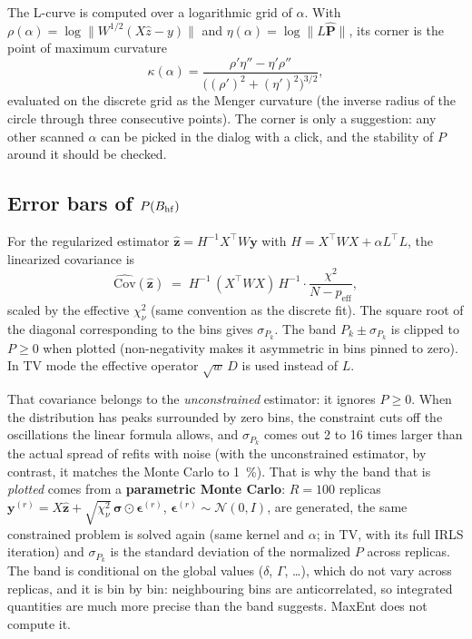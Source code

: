 \medskip
The L-curve is computed over a logarithmic grid of $\alpha$. With
$\rho(\alpha)=\log\lVert W^{1/2}(X\hat z-y)\rVert$ and
$\eta(\alpha)=\log\lVert L\hat{\bm P}\rVert$, its corner is the point of maximum
curvature
\begin{equation}
  \kappa(\alpha)=\frac{\rho'\eta''-\eta'\rho''}{\bigl((\rho')^2+(\eta')^2\bigr)^{3/2}},
\end{equation}
evaluated on the discrete grid as the Menger curvature (the inverse radius of the
circle through three consecutive points). The corner is only a suggestion: any
other scanned $\alpha$ can be picked in the dialog with a click, and the
stability of $P$ around it should be checked.

\subsection{Error bars of \texorpdfstring{$P(B_{\mathrm{hf}})$}{P(BHF)}}\label{sec:perr}

For the regularized estimator $\hat{\bm z}=H^{-1}X^\top W\bm y$ with
$H=X^\top WX+\alpha L^\top L$, the linearized covariance is
\begin{equation}
  \widehat{\mathrm{Cov}}(\hat{\bm z}) \;=\; H^{-1}\,(X^\top WX)\,H^{-1}\cdot\frac{\chi^2}{N-p_{\text{eff}}},
\end{equation}
scaled by the effective $\chi^2_\nu$ (same convention as the discrete fit). The
square root of the diagonal corresponding to the bins gives $\sigma_{P_k}$. The band
$P_k\pm\sigma_{P_k}$ is clipped to $P\ge0$ when plotted (non-negativity makes it
asymmetric in bins pinned to zero). In TV mode the effective operator $\sqrt{w}\,D$
is used instead of $L$.

That covariance belongs to the \emph{unconstrained} estimator: it ignores $P\ge0$.
When the distribution has peaks surrounded by zero bins, the constraint cuts off the
oscillations the linear formula allows, and $\sigma_{P_k}$ comes out 2 to 16 times
larger than the actual spread of refits with noise (with the unconstrained estimator,
by contrast, it matches the Monte Carlo to 1~\%). That is why the band that is
\emph{plotted} comes from a \textbf{parametric Monte Carlo}: $R=100$ replicas
$\bm y^{(r)}=X\hat{\bm z}+\sqrt{\chi^2_\nu}\,\bm\sigma\odot\bm\epsilon^{(r)}$,
$\bm\epsilon^{(r)}\sim\mathcal N(0,I)$, are generated, the same constrained
problem is solved again (same kernel and $\alpha$; in TV, with its full IRLS
iteration) and $\sigma_{P_k}$ is the standard deviation of the normalized $P$
across replicas. The band is conditional on the global values ($\delta$, $\Gamma$,
\dots), which do not vary across replicas, and it is bin by bin: neighbouring bins
are anticorrelated, so integrated quantities are much more precise than the band
suggests. MaxEnt does not compute it.

